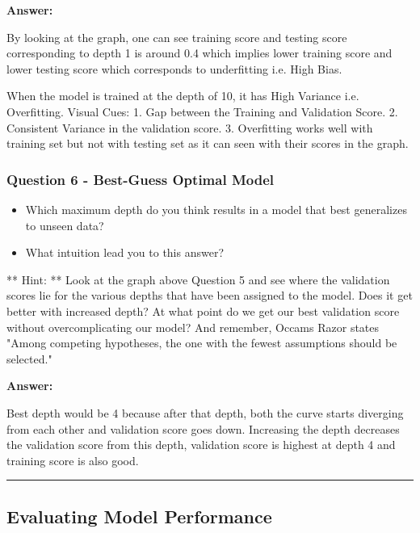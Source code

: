 \documentclass[11pt]{article}
\providecommand{\tightlist}{%
      \setlength{\itemsep}{0pt}\setlength{\parskip}{0pt}}
\begin{document}
    \textbf{Answer: }

By looking at the graph, one can see training score and testing score
corresponding to depth 1 is around 0.4 which implies lower training
score and lower testing score which corresponds to underfitting i.e.
High Bias.

When the model is trained at the depth of 10, it has High Variance i.e.
Overfitting. Visual Cues: 1. Gap between the Training and Validation
Score. 2. Consistent Variance in the validation score. 3. Overfitting
works well with training set but not with testing set as it can seen
with their scores in the graph.

    \subsubsection{Question 6 - Best-Guess Optimal
Model}\label{question-6---best-guess-optimal-model}

\begin{itemize}
\tightlist
\item
  Which maximum depth do you think results in a model that best
  generalizes to unseen data?
\item
  What intuition lead you to this answer?
\end{itemize}

** Hint: ** Look at the graph above Question 5 and see where the
validation scores lie for the various depths that have been assigned to
the model. Does it get better with increased depth? At what point do we
get our best validation score without overcomplicating our model? And
remember, Occams Razor states "Among competing hypotheses, the one with
the fewest assumptions should be selected."

    \textbf{Answer: }

Best depth would be 4 because after that depth, both the curve starts
diverging from each other and validation score goes down. Increasing the
depth decreases the validation score from this depth, validation score
is highest at depth 4 and training score is also good.

    \begin{center}\rule{0.5\linewidth}{\linethickness}\end{center}

\subsection{Evaluating Model
Performance}\label{evaluating-model-performance}
\end{document}
